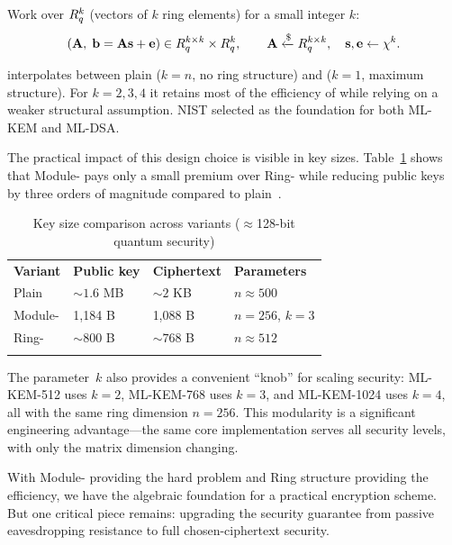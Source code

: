\begin{definition}
\label{def:mlwe}
Work over $R_q^k$ (vectors of $k$ ring elements) for a small integer $k$:
\begin{equation}
(\mathbf{A},\; \mathbf{b} = \mathbf{A}\mathbf{s} + \mathbf{e}) \in \Rq^{k\times k}\times\Rq^k, \qquad \mathbf{A}\getsr\Rq^{k\times k},\quad \mathbf{s},\mathbf{e}\leftarrow\chi^k.
\end{equation}
\end{definition}

\mlwe{} interpolates between plain \lwe{} ($k = n$, no ring structure) and \rlwe{} ($k = 1$, maximum structure).  For $k = 2,3,4$ it retains most of the efficiency of \rlwe{} while relying on a weaker structural assumption.  NIST selected \mlwe{} as the foundation for both ML-KEM and ML-DSA.

The practical impact of this design choice is visible in key sizes.  Table~\ref{tab:lwe-sizes} shows that Module-\lwe{} pays only a small premium over Ring-\lwe{} while reducing public keys by three orders of magnitude compared to plain~\lwe{}.

\begin{table}[t]
\caption{Key size comparison across \lwe{} variants ($\approx$128-bit quantum security)}
\label{tab:lwe-sizes}
\begin{tabular}{p{3cm}p{2.5cm}p{2.5cm}p{3cm}}
\hline\noalign{\smallskip}
\textbf{Variant} & \textbf{Public key} & \textbf{Ciphertext} & \textbf{Parameters} \\
\noalign{\smallskip}\svhline\noalign{\smallskip}
Plain \lwe{}     & $\sim 1.6$ MB & $\sim 2$ KB & $n \approx 500$ \\
Module-\lwe{}    & 1,184 B      & 1,088 B     & $n=256$, $k=3$ \\
Ring-\lwe{}      & $\sim 800$ B & $\sim 768$ B & $n \approx 512$ \\
\noalign{\smallskip}\hline
\end{tabular}
\end{table}

The parameter~$k$ also provides a convenient ``knob'' for scaling security: ML-KEM-512 uses $k=2$, ML-KEM-768 uses $k=3$, and ML-KEM-1024 uses $k=4$, all with the same ring dimension $n = 256$.  This modularity is a significant engineering advantage---the same core implementation serves all security levels, with only the matrix dimension changing.

With Module-\lwe{} providing the hard problem and Ring structure providing the efficiency, we have the algebraic foundation for a practical encryption scheme.  But one critical piece remains: upgrading the security guarantee from passive eavesdropping resistance to full chosen-ciphertext security.


